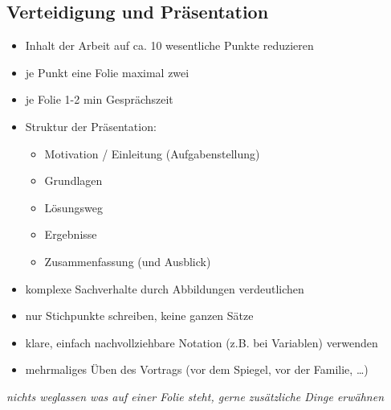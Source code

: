 \subsection*{Verteidigung und Präsentation}
\label{sec:Verteidigung}
\begin{itemize}
	\item Inhalt der Arbeit auf ca. 10 wesentliche Punkte reduzieren
	\item je Punkt eine Folie maximal zwei
	\item je Folie 1-2 min Gesprächszeit
	\item Struktur der Präsentation:
	\begin{itemize}
		\item Motivation / Einleitung (Aufgabenstellung)
		\item Grundlagen
		\item Lösungsweg
		\item Ergebnisse
		\item Zusammenfassung (und Ausblick)
	\end{itemize}
	\item komplexe Sachverhalte durch Abbildungen verdeutlichen
	\item nur Stichpunkte schreiben, keine ganzen Sätze
	\item klare, einfach nachvollziehbare Notation (z.B. bei Variablen) verwenden
	\item mehrmaliges Üben des Vortrags (\zB vor dem Spiegel, vor der Familie, \ldots)
\end{itemize}
\emph{nichts weglassen was auf einer Folie steht, gerne zusätzliche Dinge erwähnen}


